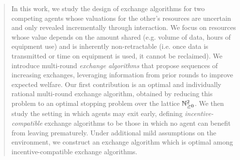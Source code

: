 \begin{abstract}
In this work, we study the design of exchange algorithms for two competing agents whose valuations for the other's 
resources are uncertain and only revealed incrementally through interaction. We focus on resources whose value 
depends on the amount shared (e.g. volume of data, hours of equipment use) and is inherently non-retractable 
(i.e. once data is transmitted or time on equipment is used, it cannot be reclaimed). We introduce multi-round 
\emph{exchange algorithms} that propose sequences of increasing exchanges, leveraging information from prior rounds 
to improve expected welfare. Our first contribution is an optimal and individually rational multi-round exchange 
algorithm, obtained by reducing this problem to an optimal stopping problem over the lattice $\NN^2_{\geq 0}$. 
We then study the 
setting in which agents may exit early, defining \emph{incentive-compatible} exchange algorithms to be those
in which no agent can benefit from leaving prematurely.
Under additional mild assumptions on the environment, we construct an exchange algorithm which is optimal
among incentive-compatible exchange algorithms.

\end{abstract}